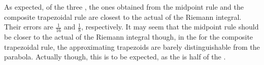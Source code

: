 \documentclass[12pt]{article}
\begin{document}
As expected, of the three , the ones obtained from the midpoint rule and the composite trapezoidal rule are closest to the actual  of the Riemann integral.  Their errors are $\displaystyle \frac{1}{16}$ and $\displaystyle \frac{1}{8}$, respectively.  It may seem  that the midpoint rule should be closer to the actual  of the Riemann integral  though, in the  for the composite trapezoidal rule, the approximating trapezoids are barely distinguishable from the parabola.  Actually though, this is to be expected, as the  is half of the .
\end{document}

